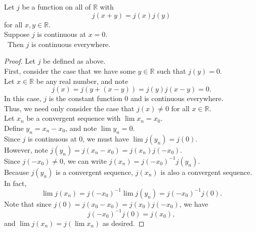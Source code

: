 \documentclass{article}
\newenvironment{theorem}[1]{\renewcommand\theinnercustomthm{#1}\innercustomthm}
  {\endinnercustomthm}
\begin{document}
\newpage{}
\begin{theorem}{4}
    Let $j$ be a function on all of $\mathbb R$ with 
    \[j(x+y)=j(x)j(y)\] for all $x,y \in \mathbb R$. \\
    Suppose $j$ is continuous at $x= 0$. \\\
    Then $j$ is continuous everywhere.
\end{theorem}
\begin{proof}
    Let $j$ be defined as above. \\
    First, consider the case that we have some $y \in \mathbb R$ such that $j(y) = 0$.  \\
    Let $x \in \mathbb R$ be any real number, and note
    \[ j(x)=j(y+(x-y))=j(y)j(x-y)=0.\]
    In this case, $j$ is the constant function $0$ and is continuous everywhere. \\
    Thus, we need only consider the case that $j(x)\neq 0$ for all $x \in \mathbb R$. \\
    Let $x_n$ be a convergent sequence with $\lim x_n = x_0$. \\
    Define $y_n=x_n - x_0$, and note $\lim y_n = 0$. \\
    Since $j$ is continuous at $0$, we must have $\lim j(y_n) = j(0)$. \\
    However, note $j(y_n)=j(x_n - x_0) = j(x_n)j(-x_0)$. \\
    Since $j(-x_0) \neq 0$, we can write $j(x_n) = j(-x_0)^{-1} j(y_n)$.
    \\ Because $j(y_n)$ is a convergent sequence, $j(x_n)$ is also a convergent sequence. \\
    In fact, \[\lim j(x_n) = j(-x_0)^{-1} \lim j(y_n) = j(-x_0)^{-1}j(0).\]
    Note that since $j(0)=j(x_0 -x_0)=j(x_0)j(-x_0)$, we have 
    \[j(-x_0)^{-1} j(0) =j(x_0),\]
    and $\lim j(x_n) = j(\lim x_n)$ as desired.
    \end{proof}
\end{document}
